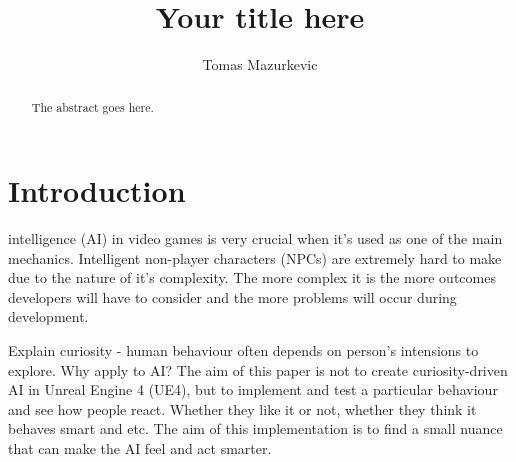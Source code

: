 \documentclass[journal]{IEEEtran}
\begin{document}
%
\title{Your title here}
%
%
\author{Tomas Mazurkevic}


\maketitle

\begin{abstract}
The abstract goes here.
\end{abstract}

\section{Introduction}
% 
% 
% 
% 
 intelligence (AI) in video games is very crucial when it's used as one of the main mechanics. Intelligent non-player characters (NPCs) are extremely hard to make due to the nature of it's complexity. The more complex it is the more outcomes developers will have to consider and the more problems will occur during development. 

Explain curiosity - human behaviour often depends on person's intensions to explore. Why apply to AI? The aim of this paper is not to create curiosity-driven AI in Unreal Engine 4 (UE4), but to implement and test a particular behaviour and see how people react. Whether they like it or not, whether they think it behaves smart and etc. The aim of this implementation is to find a small nuance that can make the AI feel and act smarter.
\end{document}
